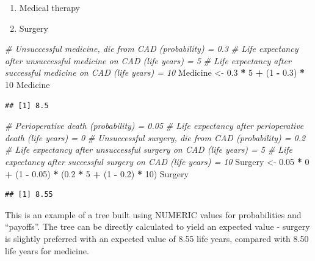 \documentclass[
]{article}
\newenvironment{Shaded}{\begin{snugshade}}{\end{snugshade}}
\newcommand{\CommentTok}[1]{\textcolor[rgb]{0.56,0.35,0.01}{\textit{#1}}}
\newcommand{\DecValTok}[1]{\textcolor[rgb]{0.00,0.00,0.81}{#1}}
\newcommand{\FloatTok}[1]{\textcolor[rgb]{0.00,0.00,0.81}{#1}}
\newcommand{\NormalTok}[1]{#1}
\newcommand{\OtherTok}[1]{\textcolor[rgb]{0.56,0.35,0.01}{#1}}
\newcommand{\SpecialCharTok}[1]{\textcolor[rgb]{0.81,0.36,0.00}{\textbf{#1}}}
\providecommand{\tightlist}{%
  \setlength{\itemsep}{0pt}\setlength{\parskip}{0pt}}
\begin{document}
\begin{enumerate}
\def\labelenumi{\arabic{enumi}.}
\tightlist
\item
  Medical therapy
\item
  Surgery
\end{enumerate}

\begin{Shaded}
\begin{Highlighting}[]
\CommentTok{\# Unsuccessful medicine, die from CAD (probability) = 0.3}
\CommentTok{\# Life expectancy after unsuccessful medicine on CAD (life years) = 5}
\CommentTok{\# Life expectancy after successful medicine on CAD (life years) = 10}
\NormalTok{Medicine }\OtherTok{\textless{}{-}} \FloatTok{0.3} \SpecialCharTok{*} \DecValTok{5} \SpecialCharTok{+}\NormalTok{ (}\DecValTok{1} \SpecialCharTok{{-}} \FloatTok{0.3}\NormalTok{) }\SpecialCharTok{*} \DecValTok{10}
\NormalTok{Medicine}
\end{Highlighting}
\end{Shaded}

\begin{verbatim}
## [1] 8.5
\end{verbatim}

\begin{Shaded}
\begin{Highlighting}[]
\CommentTok{\# Perioperative death (probability) = 0.05}
\CommentTok{\# Life expectancy after perioperative death (life years) = 0}
\CommentTok{\# Unsuccessful surgery, die from CAD (probability) = 0.2}
\CommentTok{\# Life expectancy after unsuccessful surgery on CAD (life years) = 5}
\CommentTok{\# Life expectancy after successful surgery on CAD (life years) = 10}
\NormalTok{Surgery  }\OtherTok{\textless{}{-}} \FloatTok{0.05} \SpecialCharTok{*} \DecValTok{0} \SpecialCharTok{+}\NormalTok{ (}\DecValTok{1} \SpecialCharTok{{-}} \FloatTok{0.05}\NormalTok{) }\SpecialCharTok{*}\NormalTok{ (}\FloatTok{0.2} \SpecialCharTok{*} \DecValTok{5} \SpecialCharTok{+}\NormalTok{ (}\DecValTok{1} \SpecialCharTok{{-}} \FloatTok{0.2}\NormalTok{) }\SpecialCharTok{*} \DecValTok{10}\NormalTok{)}
\NormalTok{Surgery}
\end{Highlighting}
\end{Shaded}

\begin{verbatim}
## [1] 8.55
\end{verbatim}

This is an example of a tree built using NUMERIC values for
probabilities and ``payoffs''. The tree can be directly calculated to
yield an expected value - surgery is slightly preferred with an expected
value of 8.55 life years, compared with 8.50 life years for medicine.
\end{document}
